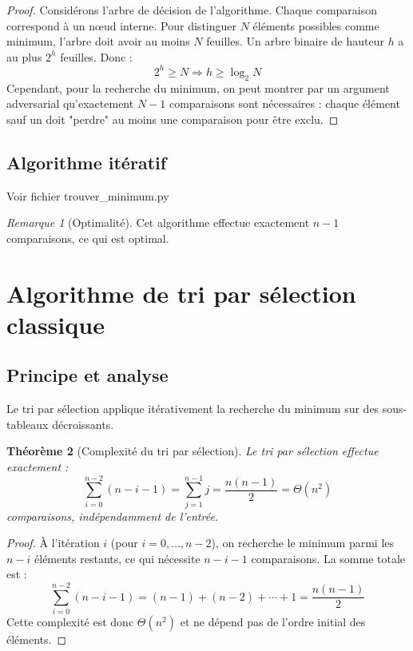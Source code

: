 \documentclass[12pt,a4paper]{article}
\newtheorem{theorem}{Théorème}[section]
\theoremstyle{definition}
\theoremstyle{remark}
\newtheorem{remark}[theorem]{Remarque}
\begin{document}
\begin{proof}
Considérons l'arbre de décision de l'algorithme. Chaque comparaison correspond à un nœud interne. Pour distinguer $N$ éléments possibles comme minimum, l'arbre doit avoir au moins $N$ feuilles. Un arbre binaire de hauteur $h$ a au plus $2^h$ feuilles. Donc :
\[
2^h \geq N \Rightarrow h \geq \log_2 N
\]
Cependant, pour la recherche du minimum, on peut montrer par un argument adversarial qu'exactement $N-1$ comparaisons sont nécessaires : chaque élément sauf un doit "perdre" au moins une comparaison pour être exclu.
\end{proof}

\subsection{Algorithme itératif}

Voir fichier trouver\_minimum.py

\begin{remark}[Optimalité]
Cet algorithme effectue exactement $n-1$ comparaisons, ce qui est optimal.
\end{remark}

\newpage

\section{Algorithme de tri par sélection classique}

\subsection{Principe et analyse}

Le tri par sélection applique itérativement la recherche du minimum sur des sous-tableaux décroissants.

\begin{theorem}[Complexité du tri par sélection]
Le tri par sélection effectue exactement :
\[
\sum_{i=0}^{n-2} (n-i-1) = \sum_{j=1}^{n-1} j = \frac{n(n-1)}{2} = \Theta(n^2)
\]
comparaisons, indépendamment de l'entrée.
\end{theorem}

\begin{proof}
À l'itération $i$ (pour $i = 0, \ldots, n-2$), on recherche le minimum parmi les $n-i$ éléments restants, ce qui nécessite $n-i-1$ comparaisons. La somme totale est :
\[
\sum_{i=0}^{n-2} (n-i-1) = (n-1) + (n-2) + \cdots + 1 = \frac{n(n-1)}{2}
\]
Cette complexité est donc $\Theta(n^2)$ et ne dépend pas de l'ordre initial des éléments.
\end{proof}
\end{document}
